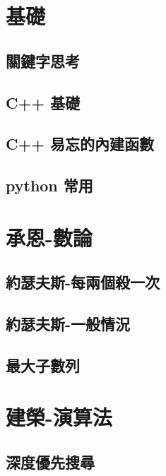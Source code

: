 \section{基礎}
\subsection{關鍵字思考}
\raggedbottom
\hrulefill
\subsection{C++ 基礎}
\raggedbottom
\hrulefill
\subsection{C++ 易忘的內建函數}
\raggedbottom
\hrulefill
\subsection{python 常用}
\raggedbottom
\hrulefill

\section{承恩-數論}
\subsection{約瑟夫斯-每兩個殺一次}
\raggedbottom
\hrulefill
\subsection{約瑟夫斯-一般情況}
\raggedbottom
\hrulefill
\subsection{最大子數列}
\raggedbottom
\hrulefill

\section{建榮-演算法}
\subsection{深度優先搜尋}
\raggedbottom
\hrulefill
